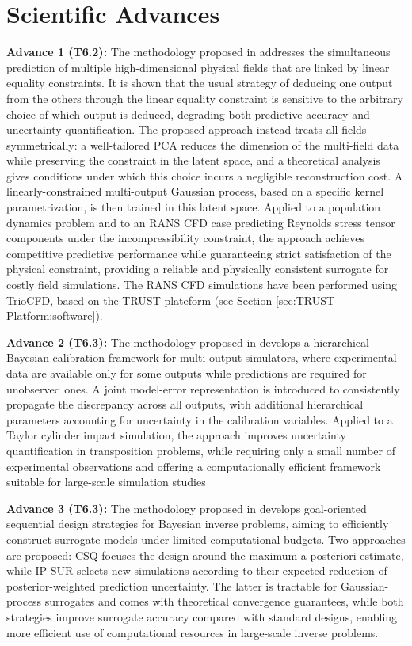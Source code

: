 \section{Scientific Advances}

\textbf{Advance 1 (T6.2):} The methodology proposed in \cite{nassouradine2026} addresses the simultaneous prediction of multiple high-dimensional physical fields that are linked by linear equality constraints. It is shown that the usual strategy of deducing one output from the others through the linear equality constraint is sensitive to the arbitrary choice of which output is deduced, degrading both predictive accuracy and uncertainty quantification. The proposed approach instead treats all fields symmetrically: a well-tailored PCA reduces the dimension of the multi-field data while preserving the constraint in the latent space, and a theoretical analysis gives conditions under which this choice incurs a negligible reconstruction cost. A linearly-constrained multi-output Gaussian process, based on a specific kernel parametrization, is then trained in this latent space. Applied to a population dynamics problem and to an RANS CFD case predicting Reynolds stress tensor components under the incompressibility constraint, the approach achieves competitive predictive performance while guaranteeing strict satisfaction of the physical constraint, providing a reliable and physically consistent surrogate for costly field simulations. The RANS CFD simulations have been performed using TrioCFD, based on the TRUST plateform (see Section \ref{sec:TRUST Platform:software}).

\textbf{Advance 2 (T6.3):} The methodology proposed in \cite{sire2025} develops a hierarchical Bayesian calibration framework for multi-output simulators, where experimental data are available only for some outputs while predictions are required for unobserved ones. A joint model-error representation is introduced to consistently propagate the discrepancy across all outputs, with additional hierarchical parameters accounting for uncertainty in the calibration variables. Applied to a Taylor cylinder impact simulation, the approach improves uncertainty quantification in transposition problems, while requiring only a small number of experimental observations and offering a computationally efficient framework suitable for large-scale simulation studies

\textbf{Advance 3 (T6.3):} The methodology proposed in \cite{lartaud2026} develops goal-oriented sequential design strategies for Bayesian inverse problems, aiming to efficiently construct surrogate models under limited computational budgets. Two approaches are proposed: CSQ focuses the design around the maximum a posteriori estimate, while IP-SUR selects new simulations according to their expected reduction of posterior-weighted prediction uncertainty. The latter is tractable for Gaussian-process surrogates and comes with theoretical convergence guarantees, while both strategies improve surrogate accuracy compared with standard designs, enabling more efficient use of computational resources in large-scale inverse problems.

